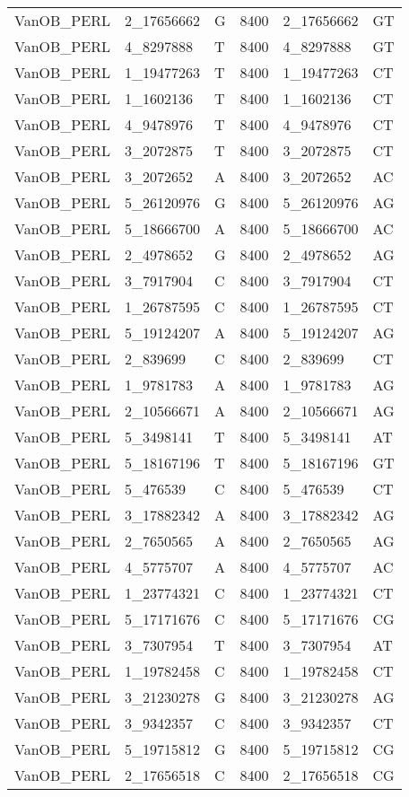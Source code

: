 \begin{center}
\begin{longtable}{|l|l|l|l|l|l|}
VanOB\_PERL&2\_17656662&G&8400&2\_17656662&GT\\
VanOB\_PERL&4\_8297888&T&8400&4\_8297888&GT\\
VanOB\_PERL&1\_19477263&T&8400&1\_19477263&CT\\
VanOB\_PERL&1\_1602136&T&8400&1\_1602136&CT\\
VanOB\_PERL&4\_9478976&T&8400&4\_9478976&CT\\
VanOB\_PERL&3\_2072875&T&8400&3\_2072875&CT\\
VanOB\_PERL&3\_2072652&A&8400&3\_2072652&AC\\
VanOB\_PERL&5\_26120976&G&8400&5\_26120976&AG\\
VanOB\_PERL&5\_18666700&A&8400&5\_18666700&AC\\
VanOB\_PERL&2\_4978652&G&8400&2\_4978652&AG\\
VanOB\_PERL&3\_7917904&C&8400&3\_7917904&CT\\
VanOB\_PERL&1\_26787595&C&8400&1\_26787595&CT\\
VanOB\_PERL&5\_19124207&A&8400&5\_19124207&AG\\
VanOB\_PERL&2\_839699&C&8400&2\_839699&CT\\
VanOB\_PERL&1\_9781783&A&8400&1\_9781783&AG\\
VanOB\_PERL&2\_10566671&A&8400&2\_10566671&AG\\
VanOB\_PERL&5\_3498141&T&8400&5\_3498141&AT\\
VanOB\_PERL&5\_18167196&T&8400&5\_18167196&GT\\
VanOB\_PERL&5\_476539&C&8400&5\_476539&CT\\
VanOB\_PERL&3\_17882342&A&8400&3\_17882342&AG\\
VanOB\_PERL&2\_7650565&A&8400&2\_7650565&AG\\
VanOB\_PERL&4\_5775707&A&8400&4\_5775707&AC\\
VanOB\_PERL&1\_23774321&C&8400&1\_23774321&CT\\
VanOB\_PERL&5\_17171676&C&8400&5\_17171676&CG\\
VanOB\_PERL&3\_7307954&T&8400&3\_7307954&AT\\
VanOB\_PERL&1\_19782458&C&8400&1\_19782458&CT\\
VanOB\_PERL&3\_21230278&G&8400&3\_21230278&AG\\
VanOB\_PERL&3\_9342357&C&8400&3\_9342357&CT\\
VanOB\_PERL&5\_19715812&G&8400&5\_19715812&CG\\
VanOB\_PERL&2\_17656518&C&8400&2\_17656518&CG\\

\end{longtable}
\end{center}
